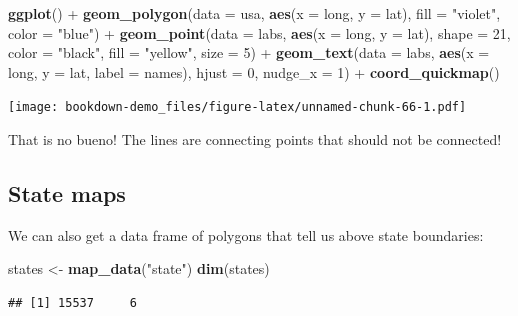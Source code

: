 \documentclass[]{book}
\newenvironment{Shaded}{\begin{snugshade}}{\end{snugshade}}
\newcommand{\KeywordTok}[1]{\textcolor[rgb]{0.13,0.29,0.53}{\textbf{{#1}}}}
\newcommand{\DataTypeTok}[1]{\textcolor[rgb]{0.13,0.29,0.53}{{#1}}}
\newcommand{\DecValTok}[1]{\textcolor[rgb]{0.00,0.00,0.81}{{#1}}}
\newcommand{\StringTok}[1]{\textcolor[rgb]{0.31,0.60,0.02}{{#1}}}
\newcommand{\NormalTok}[1]{{#1}}
\theoremstyle{definition}
\theoremstyle{definition}
\theoremstyle{remark}
\begin{document}
\begin{Shaded}
\begin{Highlighting}[]
\KeywordTok{ggplot}\NormalTok{() +}\StringTok{ }
\StringTok{      }\KeywordTok{geom_polygon}\NormalTok{(}\DataTypeTok{data =} \NormalTok{usa, }\KeywordTok{aes}\NormalTok{(}\DataTypeTok{x =} \NormalTok{long, }\DataTypeTok{y =} \NormalTok{lat), }\DataTypeTok{fill =} \StringTok{"violet"}\NormalTok{, }\DataTypeTok{color =} \StringTok{"blue"}\NormalTok{) +}\StringTok{ }
\StringTok{      }\KeywordTok{geom_point}\NormalTok{(}\DataTypeTok{data =} \NormalTok{labs, }\KeywordTok{aes}\NormalTok{(}\DataTypeTok{x =} \NormalTok{long, }\DataTypeTok{y =} \NormalTok{lat), }\DataTypeTok{shape =} \DecValTok{21}\NormalTok{, }\DataTypeTok{color =} \StringTok{"black"}\NormalTok{, }\DataTypeTok{fill =} \StringTok{"yellow"}\NormalTok{, }\DataTypeTok{size =} \DecValTok{5}\NormalTok{) +}
\StringTok{      }\KeywordTok{geom_text}\NormalTok{(}\DataTypeTok{data =} \NormalTok{labs, }\KeywordTok{aes}\NormalTok{(}\DataTypeTok{x =} \NormalTok{long, }\DataTypeTok{y =} \NormalTok{lat, }\DataTypeTok{label =} \NormalTok{names), }\DataTypeTok{hjust =} \DecValTok{0}\NormalTok{, }\DataTypeTok{nudge_x =} \DecValTok{1}\NormalTok{) +}
\StringTok{      }\KeywordTok{coord_quickmap}\NormalTok{()}
\end{Highlighting}
\end{Shaded}

\texttt{[image: bookdown-demo\_files/figure-latex/unnamed-chunk-66-1.pdf]}

That is no bueno! The lines are connecting points that should not be
connected!

\subsection{State maps}\label{state-maps}

We can also get a data frame of polygons that tell us above state
boundaries:

\begin{Shaded}
\begin{Highlighting}[]
\NormalTok{states <-}\StringTok{ }\KeywordTok{map_data}\NormalTok{(}\StringTok{"state"}\NormalTok{)}
\KeywordTok{dim}\NormalTok{(states)}
\end{Highlighting}
\end{Shaded}

\begin{verbatim}
## [1] 15537     6
\end{verbatim}
\end{document}
